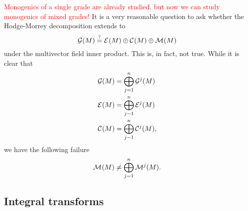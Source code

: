 \textcolor{red}{Monogenics of a single grade are already studied. but now we can study monogenics of mixed grades!} It is a very reasonable question to ask whether the Hodge-Morrey decomposition extends to
    \begin{equation}
        \mathcal{G}(M) \stackrel{?}{=} \mathcal{E}^{}(M) \oplus \mathcal{C}^{}(M) \oplus \mathcal{M}^{}(M)
    \end{equation} 
under the multivector field inner product. This is, in fact, not true.  While it is clear that
\begin{align}
    \mathcal{G}(M) &= \bigoplus_{j=1}^n \mathcal{G}^j(M)\\
    \mathcal{E}^{}(M) &= \bigoplus_{j-1}^n \mathcal{E}^{j}(M)\\
    \mathcal{C}^{}(M) &= \bigoplus_{j-1}^n \mathcal{C}^{j}(M),
\end{align}
we have the following failure
\begin{equation}
    \mathcal{M}^{}(M) \neq \bigoplus_{j=1}^n \mathcal{M}^{j}(M).
\end{equation}


\subsection{Integral transforms}
